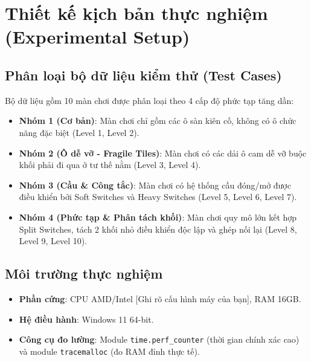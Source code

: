 \chapter{Thiết kế kịch bản thực nghiệm (Experimental Setup)}

\newpage

\section{Phân loại bộ dữ liệu kiểm thử (Test Cases)}
Bộ dữ liệu gồm 10 màn chơi được phân loại theo 4 cấp độ phức tạp tăng dần:
\begin{itemize}
    \item \textbf{Nhóm 1 (Cơ bản)}: Màn chơi chỉ gồm các ô sàn kiên cố, không có ô chức năng đặc biệt (Level 1, Level 2).
    \item \textbf{Nhóm 2 (Ô dễ vỡ - Fragile Tiles)}: Màn chơi có các dải ô cam dễ vỡ buộc khối phải đi qua ở tư thế nằm (Level 3, Level 4).
    \item \textbf{Nhóm 3 (Cầu \& Công tắc)}: Màn chơi có hệ thống cầu đóng/mở được điều khiển bởi Soft Switches và Heavy Switches (Level 5, Level 6, Level 7).
    \item \textbf{Nhóm 4 (Phức tạp \& Phân tách khối)}: Màn chơi quy mô lớn kết hợp Split Switches, tách 2 khối nhỏ điều khiển độc lập và ghép nối lại (Level 8, Level 9, Level 10).
\end{itemize}

\section{Môi trường thực nghiệm}
\begin{itemize}
    \item \textbf{Phần cứng}: CPU AMD/Intel [Ghi rõ cấu hình máy của bạn], RAM 16GB.
    \item \textbf{Hệ điều hành}: Windows 11 64-bit.
    \item \textbf{Công cụ đo lường}: Module \texttt{time.perf_counter} (thời gian chính xác cao) và module \texttt{tracemalloc} (đo RAM đỉnh thực tế).
\end{itemize}
